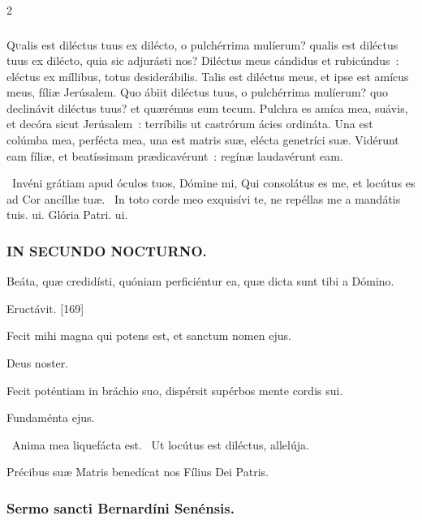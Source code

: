 \documentclass[9pt,twoside]{extarticle}
\begin{document}
\begin{multicols}{2}
\subsubsection*{\center {}}
\lettrine{Q}ualis est diléctus tuus ex dilécto, o pulchérrima mulíerum? qualis est diléctus tuus ex dilécto, quia sic adjurásti nos?
Diléctus meus cándidus et rubicúndus~: eléctus ex míllibus, totus desiderábilis. Talis est diléctus meus, et ipse est amícus meus, fíliæ Jerúsalem.
Quo ábiit diléctus tuus, o pulchérrima mulíerum? quo declinávit diléctus tuus? et quærémus eum tecum.
Pulchra es amíca mea, suávis, et decóra sicut Jerúsalem~: terríbilis ut castrórum ácies ordináta.
Una est colúmba mea, perfécta mea, una est matris suæ, elécta genetríci suæ. Vidérunt eam fíliæ, et beatíssimam prædicavérunt~: regínæ laudavérunt eam.

\begin{tightlist}{}
\item {}~Invéni grátiam apud óculos tuos, Dómine mi, \textred{*} Qui consolátus es me, et locútus es ad Cor ancíllæ tuæ. ~In toto corde meo exquisívi te, ne repéllas me a mandátis tuis. ui. Glória Patri. ui.
\end{tightlist}

\subsubsection*{\center \textsc{IN SECUNDO NOCTURNO.}}
\begin{tightlist}{}
\item {} Beáta, quæ credidísti, quóniam perficiéntur ea, quæ dicta sunt tibi a Dómino.
\item {} Eructávit. [169]
\item {} Fecit mihi magna qui potens est, et sanctum nomen ejus.
\item {} Deus noster.
\item {} Fecit poténtiam in bráchio suo, dispérsit supérbos mente cordis sui.
\item {} Fundaménta ejus.
\item {}~Anima mea liquefácta est. ~Ut locútus est diléctus, allelúja.
\item {} Précibus suæ Matris benedícat nos Fílius Dei Patris.
\end{tightlist}

\subsubsection*{\center Sermo sancti Bernardíni Senénsis.}

\end{multicols}
\end{document}
